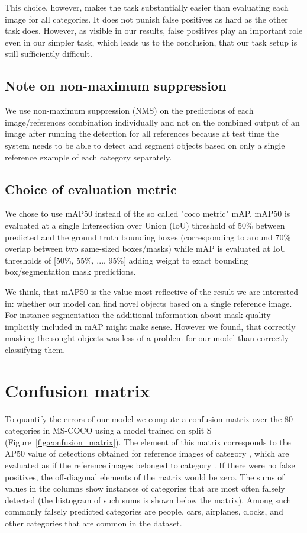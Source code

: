 \documentclass{article}
\newcommand{\coco}{MS-COCO\xspace}
\begin{document}
This choice, however, makes the task substantially easier than evaluating each image for all categories. It does not punish false positives as hard as the other task does. However, as visible in our results, false positives play an important role even in our simpler task, which leads us to the conclusion, that our task setup is still sufficiently difficult.

\subsection{Note on non-maximum suppression}
We use non-maximum suppression (NMS) on the predictions of each image/references combination individually and not on the combined output of an image after running the detection for all references because at test time the system needs to be able to detect and segment objects based on only a single reference example of each category separately.

\subsection{Choice of evaluation metric}

We chose to use mAP50 instead of the so called "coco metric" mAP. mAP50 is evaluated at a single Intersection over Union (IoU) threshold of 50\% between predicted and the ground truth bounding boxes (corresponding to around 70\% overlap between two same-sized boxes/masks) while mAP is evaluated at IoU thresholds of [50\%, 55\%, ..., 95\%] adding weight to exact bounding box/segmentation mask predictions.

We think, that mAP50 is the value most reflective of the result we are interested in: whether our model can find novel objects based on a single reference image. For instance segmentation the additional information about mask quality implicitly included in mAP might make sense. However we found, that correctly masking the sought objects was less of a problem for our model than correctly classifying them.

\section{Confusion matrix}
\label{appendix:confusion_matrix}

To quantify the errors of our model we compute a confusion matrix over the 80 categories in \coco using a model trained on split S (Figure~\ref{fig:confusion_matrix}). The element  of this matrix corresponds to the AP50 value of detections obtained for reference images of category , which are evaluated as if the reference images belonged to category . If there were no false positives, the off-diagonal elements of the matrix would be zero. The sums of values in the columns show instances of categories that are most often falsely detected (the histogram of such sums is shown below the matrix). Among such commonly falsely predicted categories are people, cars, airplanes, clocks, and other categories that are common in the dataset.
\end{document}

